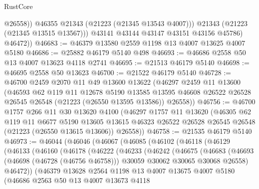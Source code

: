 \begin{lexlean}{RustCore}
\begin{coremodule}
                  @26558))
              @46355
              @21343
              (@21223 (@21345 @13543 @4007)))
            @21343
            (@21223 (@21345 @13515 @13567)))
          @43141
          @43144
          @43147
          @43151
          @43156
          @45786)
        @46472))
@46683 := @46379 @13580 @2559 @1198 @13 @4007 @13625 @4007 @5180
@46686 := @25882 @46179 @5140 @498
@46693 := @46686 @2558 @50 @13 @4007 @13623 @4118 @2741
@46695 := @21513 @46179 @5140
@46698 := @46695 @2558 @50 @13623
@46700 := @21522 @46179 @5140
@46728 := @46700
    @2459
    @2070
    @11
    @49
    @13600
    @13622
    (@46297
      @2459
      @11
      @13600
      (@46593
        @62
        @119
        @11
        @12678
        @5190
        @13585
        @13595
        @46608
        @26522
        @26528
        @26545
        @26548
        (@21223 (@26550 @13595 @13586))
        @26558))
@46756 := @46700
    @1757
    @266
    @11
    @30
    @13620
    @4100
    (@46297
      @1757
      @11
      @13620
      (@46305
        @62
        @119
        @11
        @6677
        @5190
        @13605
        @13615
        @46323
        @26522
        @26528
        @26545
        @26548
        (@21223 (@26550 @13615 @13606))
        @26558))
@46758 := @21535 @46179 @5140
@46973 := @46044
    (@46046
      (@46067
        (@46085
          (@46102
            (@46118
              (@46129
                (@46133
                  (@46160
                    (@46178
                      (@46222
                        (@46233
                          (@46242
                            (@46675
                              (@46683
                                (@46693
                                  (@46698 (@46728 (@46756 @46758)))
                                  @30059
                                  @30062
                                  @30065
                                  @30068
                                  @26558)
                                @46472))
                            (@46379
                              @13628
                              @2564
                              @1198
                              @13
                              @4007
                              @13675
                              @4007
                              @5180
                              (@46686
                                @2563
                                @50
                                @13
                                @4007
                                @13673
                                @4118

\end{coremodule}
\end{lexlean}
